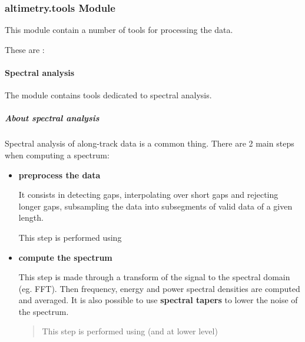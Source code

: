 \documentclass[letterpaper,10pt,english]{sphinxmanual}
\begin{document}
\subsubsection{altimetry.tools Module}
\label{altimetry.tools:altimetry-tools-module}\label{altimetry.tools::doc}
This module contain a number of tools for processing the data.

These are :


\paragraph{Spectral analysis}
\label{altimetry.tools.spectrum:spectral-tools}\label{altimetry.tools.spectrum:spectral-analysis}\label{altimetry.tools.spectrum::doc}
The {\hyperref[altimetry.tools.spectrum:module-altimetry.tools.spectrum]{\emph{}}} module contains tools dedicated to spectral analysis.


\subparagraph{About spectral analysis}
\label{altimetry.tools.spectrum:about-spectral-analysis}
Spectral analysis of along-track data is a common thing. There are 2 main steps when computing a spectrum:
\begin{itemize}
\item {} 
\textbf{preprocess the data}

It consists in detecting gaps, interpolating over short gaps and rejecting longer gaps, subsampling the data into subsegments of valid data of a given length.

This step is performed using {\hyperref[altimetry.tools.spectrum:altimetry.tools.spectrum.preprocess]{\emph{}}}

\item {} 
\textbf{compute the spectrum}

This step is made through a transform of the signal to the spectral domain (eg. FFT). Then frequency, energy and power spectral densities are computed and averaged. It is also possible to use \textbf{spectral tapers} to lower the noise of the spectrum.
\begin{quote}

This step is performed using {\hyperref[altimetry.tools.spectrum:altimetry.tools.spectrum.spectral_analysis]{\emph{}}} (and {\hyperref[altimetry.tools.spectrum:altimetry.tools.spectrum.get_spec]{\emph{}}} at lower level)
\end{quote}

\end{itemize}
\end{document}
